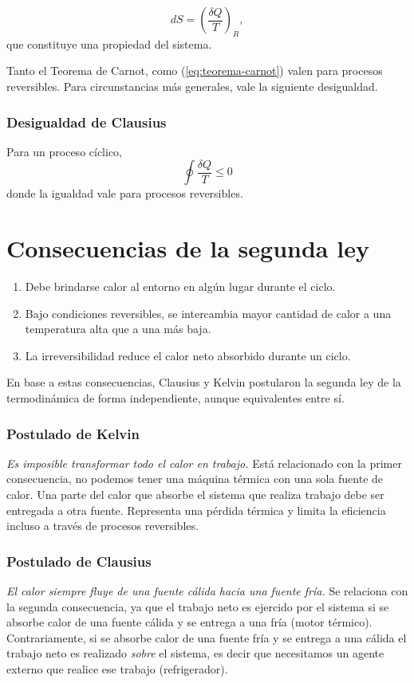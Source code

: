 \documentclass[openany]{book}
\begin{document}
\begin{equation}\label{eq:dS}
	dS=\left(\frac{\delta Q}{T}\right)_R,
\end{equation}
que constituye una propiedad del sistema.

\par Tanto el Teorema de Carnot, como (\ref{eq:teorema-carnot}) valen para procesos reversibles. Para circunstancias más generales, vale la siguiente desigualdad.

\subsubsection{Desigualdad de Clausius}
Para un proceso cíclico,
\begin{equation}\label{eq:des-clausius}
	\oint\frac{\delta Q}{T}\leq 0
\end{equation}
donde la igualdad vale para procesos reversibles.

\section{Consecuencias de la segunda ley}
\begin{enumerate}
	\item Debe brindarse calor al entorno en algún lugar durante el ciclo.
	\item Bajo condiciones reversibles, se intercambia mayor cantidad de calor a una temperatura alta que a una más baja.
	\item La irreversibilidad reduce el calor neto absorbido durante un ciclo.
\end{enumerate}
\par En base a estas consecuencias, Clausius y Kelvin postularon la segunda ley de la termodinámica de forma independiente, aunque equivalentes entre sí.

\subsubsection{Postulado de Kelvin}
{\sl Es imposible transformar todo el calor en trabajo.} Está relacionado con la primer consecuencia, no podemos tener una máquina térmica con una sola fuente de calor. Una parte del calor que absorbe el sistema que realiza trabajo debe ser entregada a otra fuente. Representa una pérdida térmica y limita la eficiencia incluso a través de procesos reversibles.

\subsubsection{Postulado de Clausius}
{\sl El calor siempre fluye de una fuente cálida hacia una fuente fría.} Se relaciona con la segunda consecuencia, ya que el trabajo neto es ejercido por el sistema si se absorbe calor de una fuente cálida y se entrega a una fría (motor térmico). Contrariamente, si se absorbe calor de una fuente fría y se entrega a una cálida el trabajo neto es realizado \emph{sobre} el sistema, es decir que necesitamos un agente externo que realice ese trabajo (refrigerador).
\end{document}
